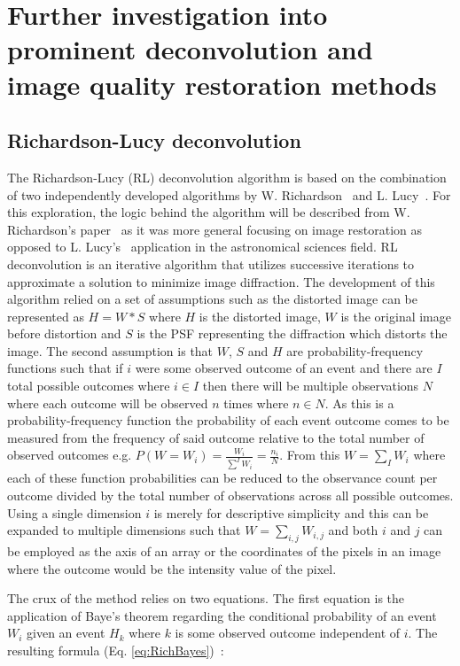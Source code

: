 \section{Further investigation into prominent deconvolution and image quality restoration methods}\label{sec:further_methods}
\subsection{Richardson-Lucy deconvolution}\label{subsec:richardson_lucy}
The Richardson-Lucy (RL) deconvolution algorithm is based on the combination of two independently developed algorithms by W. Richardson~\cite{Richardson} and L. Lucy~\cite{LucyL}. For this exploration, the logic behind the algorithm will be described from W. Richardson's paper~\cite{Richardson} as it was more general focusing on image restoration as opposed to L. Lucy's~\cite{LucyL} application in the astronomical sciences field. RL deconvolution is an iterative algorithm that utilizes successive iterations to approximate a solution to minimize image diffraction. The development of this algorithm relied on a set of assumptions such as the distorted image can be represented as $H=W*S$ where $H$ is the distorted image, $W$ is the original image before distortion and $S$ is the PSF representing the diffraction which distorts the image. The second assumption is that $W$, $S$ and $H$ are probability-frequency functions such that if $i$ were some observed outcome of an event and there are $I$ total possible outcomes where $i \in I$ then there will be multiple observations $N$ where each outcome will be observed $n$ times where $n \in N$. As this is a probability-frequency function the probability of each event outcome comes to be measured from the frequency of said outcome relative to the total number of observed outcomes e.g. $P(W=W_i) = \frac{W_i}{\sum^I W_i} = \frac{n_i}{N}$. From this $W = \sum_I W_i$ where each of these function probabilities can be reduced to the observance count per outcome divided by the total number of observations across all possible outcomes. Using a single dimension $i$ is merely for descriptive simplicity and this can be expanded to multiple dimensions such that $W = \sum_{i,j} W_{i,j}$ and both $i$ and $j$ can be employed as the axis of an array or the coordinates of the pixels in an image where the outcome would be the intensity value of the pixel.\par The crux of the method relies on two equations. The first equation is the application of Baye's theorem regarding the conditional probability of an event $W_i$ given an event $H_k$ where $k$ is some observed outcome independent of $i$. The resulting formula (Eq. \ref{eq:RichBayes})~\cite[Eq. 1]{Richardson}:
